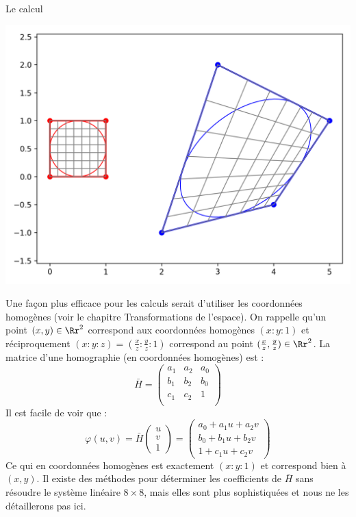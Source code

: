 \documentclass[11pt,class=report,crop=false]{standalone}
\begin{document}
Le calcul
\begin{center}
	\includegraphics[scale=\myscale,scale=0.7]{figures/carre-quadrilatere}
\end{center}


\medskip

Une façon plus efficace pour les calculs serait d'utiliser les coordonnées homogènes (voir le chapitre \og{}Transformations de l'espace\fg{}). On rappelle qu'un point $(x,y) \in \Rr^2$ correspond aux coordonnées homogènes $(x:y:1)$ et réciproquement $(x:y:z) = (\frac{x}{z}:\frac{y}{z}:1)$ correspond au point $(\frac{x}{z},\frac{y}{z}) \in \Rr^2$.
La matrice d'une homographie (en coordonnées homogènes) est :
$$
\bar H = \begin{pmatrix}
a_1 & a_2 & a_0 \\
b_1 & b_2 & b_0 \\
c_1 & c_2 & 1 \\
\end{pmatrix}	
$$	 
Il est facile de voir que :
$$\varphi(u,v) 
= \bar H \begin{pmatrix}u\\v\\1\end{pmatrix} 
= \begin{pmatrix}a_0+a_1u+a_2v\\b_0+b_1u+b_2v\\1+c_1u+c_2v\end{pmatrix}$$
Ce qui en coordonnées homogènes est exactement $(x:y:1)$ et correspond bien à $(x,y)$.
Il existe des méthodes pour déterminer les coefficients de $\bar H$ sans résoudre le système linéaire $8\times8$, mais elles sont plus sophistiquées et nous ne les détaillerons pas ici.
	
\end{document}
